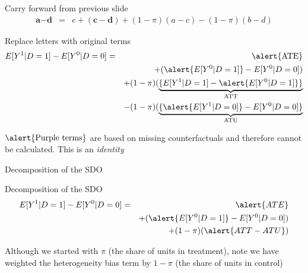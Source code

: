 \documentclass{beamer}
\begin{document}
\begin{frame}[shrink=20,plain]
  \begin{block}{Carry forward from previous slide}
    \begin{eqnarray*}
      \textbf{a}-\textbf{d}&=&e  + (\textbf{c} - \textbf{d}) + (1-\pi)(a-c) -(1-\pi)(b-d)
    \end{eqnarray*}
  \end{block}

  \begin{block}{Replace letters with original terms }
    \begin{eqnarray*}
      E[Y^1|D=1] - E[Y^0|D=0] &=& \alert{\text{ATE}}  \\
      &&+ (\alert{E[Y^0|D=1]} - E[Y^0|D=0])  \\
      && + (1-\pi)( \underbrace{\{E[Y^1|D=1] - \alert{E[Y^0|D=1]}\}}_{ \mathclap{\text{ATT}}}  \\
      && - (1-\pi)( \underbrace{\{\alert{E[Y^1|D=0]} - {E[Y^0|D=0]}\}}_{ \mathclap{\text{ATU}}}  \\
    \end{eqnarray*}
  \end{block}
  
$\alert{\text{Purple terms}}$ are based on missing counterfactuals and therefore cannot be calculated. This is an \emph{identity}
  
\end{frame}

\begin{frame}{Decomposition of the SDO}

  \begin{block}{Decomposition of the SDO}
    \begin{eqnarray*}
      E[Y^1 | D=1] - E[Y^0 | D=0]  &=& \alert{ATE} \\
      &&+ (\alert{E[Y^0|D=1]} - E[Y^0|D=0])  \\
      && + (1-\pi)(\alert{ATT - ATU})
    \end{eqnarray*}
  \end{block}
  
  \bigskip
  
Although we started with $\pi$ (the share of units in treatment), note we have weighted the heterogeneity bias term by $1-\pi$ (the share of units in control)
\end{frame}
\end{document}
